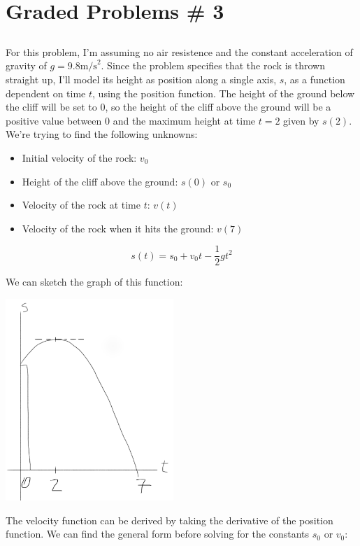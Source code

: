 \documentclass{article}
\begin{document}
\section*{Graded Problems \# 3}

\subsection{}
For this problem, I'm assuming no air resistence and the constant acceleration of gravity of $g = 9.8\text{m/s}^2$. Since the problem specifies that the rock is thrown straight up, I'll model its height as position along a single axis, $s$, as a function dependent on time $t$, using the position function. The height of the ground below the cliff will be set to 0, so the height of the cliff above the ground will be a positive value between 0 and the maximum height at time $t=2$ given by $s(2)$.
\\

We're trying to find the following unknowns:
\begin{itemize}
\item Initial velocity of the rock: $v_{0}$
\item Height of the cliff above the ground: $s(0)$ or $s_{0}$
\item Velocity of the rock at time $t$: $v(t)$
\item Velocity of the rock when it hits the ground: $v(7)$
\end{itemize}

$$
s(t) = s_{0} + v_{0}t - \frac{1}{2}gt^2
$$

We can sketch the graph of this function:

\includegraphics[height=3in]{gp3-sketch}

The velocity function can be derived by taking the derivative of the position function. We can find the general form before solving for the constants $s_{0}$ or $v_{0}$:
\\
\end{document}
